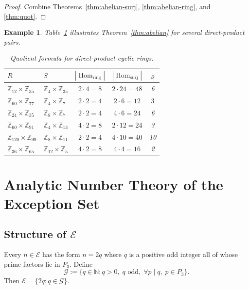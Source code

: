 \documentclass[12pt]{amsart}
\theoremstyle{bluehead}
\theoremstyle{orangehead}
\newtheorem{example}[theorem]{Example}
\theoremstyle{greenhead}
\newcommand{\Z}{\mathbb{Z}}
\newcommand{\N}{\mathbb{N}}
\newcommand{\Hring}{\operatorname{Hom}_{\mathrm{ring}}}
\newcommand{\Hsurj}{\operatorname{Hom}_{\mathrm{surj}}}
\newcommand{\Exc}{\mathcal{E}}
\newcommand{\Gauss}{\mathcal{G}}
\begin{document}
\begin{proof}
  Combine Theorems~\ref{thm:abelian-surj}, \ref{thm:abelian-ring},
  and \ref{thm:quot}.
\qedhere
\end{proof}

\begin{example}
Table~\ref{tab:abelian} illustrates Theorem~\ref{thm:abelian} for
several direct-product pairs.

\begin{table}[!ht]
\centering
\small
\caption{Quotient formula for direct-product cyclic rings.}
\label{tab:abelian}
\begin{tabular}{@{}llccc@{}}
\toprule
$R$ & $S$ & $|\Hring|$ & $|\Hsurj|$ & $\varrho$ \\
\midrule
$\Z_{12}\times\Z_{35}$ & $\Z_4\times\Z_{35}$  & $2\cdot4=8$  & $2\cdot24=48$ & 6 \\
$\Z_{60}\times\Z_{77}$ & $\Z_4\times\Z_7$     & $2\cdot2=4$  & $2\cdot6=12$  & $3$\\
$\Z_{24}\times\Z_{35}$ & $\Z_8\times\Z_7$     & $2\cdot2=4$  & $4\cdot6=24$  & 6 \\
$\Z_{60}\times\Z_{91}$ & $\Z_4\times\Z_{13}$  & $4\cdot2=8$  & $2\cdot12=24$ & 3 \\
$\Z_{120}\times\Z_{99}$& $\Z_8\times\Z_{11}$  & $2\cdot2=4$  & $4\cdot10=40$ & 10\\
$\Z_{36}\times\Z_{65}$ & $\Z_{12}\times\Z_5$  & $4\cdot2=8$  & $4\cdot4=16$  & 2 \\
\bottomrule
\end{tabular}
\end{table}
\end{example}

\section{Analytic Number Theory of the Exception Set}\label{sec:analytic}

\subsection{Structure of \texorpdfstring{$\Exc$}{E}}

Every $n\in\Exc$ has the form $n=2q$ where $q$ is a positive odd integer
all of whose prime factors lie in $P_3$.  Define
\[
  \Gauss:=\{q\in\N:q>0,\;q\text{ odd},\;
  \forall p\mid q,\;p\in P_3\}.
\]
Then $\Exc=\{2q:q\in\Gauss\}$.
\end{document}

